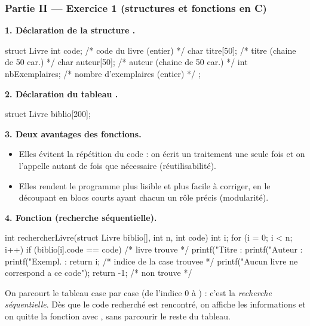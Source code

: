 \subsubsection*{Partie II — Exercice 1 (structures et fonctions en C)}

\textbf{1. Déclaration de la structure .}

\begin{codec}
struct Livre {
    int  code;             /* code du livre (entier)        */
    char titre[50];        /* titre (chaine de 50 car.)     */
    char auteur[50];       /* auteur (chaine de 50 car.)    */
    int  nbExemplaires;    /* nombre d'exemplaires (entier) */
};
\end{codec}

\medskip
\textbf{2. Déclaration du tableau .}

\begin{codec}
struct Livre biblio[200];
\end{codec}

\medskip
\textbf{3. Deux avantages des fonctions.}
\begin{itemize}
\item Elles évitent la répétition du code : on écrit un traitement une seule fois
et on l'appelle autant de fois que nécessaire (réutilisabilité).
\item Elles rendent le programme plus lisible et plus facile à corriger, en le
découpant en blocs courts ayant chacun un rôle précis (modularité).
\end{itemize}

\medskip
\textbf{4. Fonction  (recherche séquentielle).}

\begin{codec}
int rechercherLivre(struct Livre biblio[], int n, int code) {
    int i;
    for (i = 0; i < n; i++) {
        if (biblio[i].code == code) {        /* livre trouve */
            printf("Titre   : %
            printf("Auteur  : %
            printf("Exempl. : %
            return i;                        /* indice de la case trouvee */
        }
    }
    printf("Aucun livre ne correspond a ce code\n");
    return -1;                               /* non trouve */
}
\end{codec}

\begin{remarque}
On parcourt le tableau case par case (de l'indice 0 à ) : c'est la
\emph{recherche séquentielle}. Dès que le code recherché est rencontré, on
affiche les informations et on quitte la fonction avec , sans
parcourir le reste du tableau.
\end{remarque}


